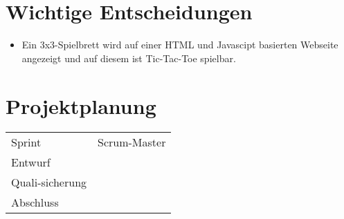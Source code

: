 \documentclass[titlepage]{scrartcl}
\begin{document}
\section{Wichtige Entscheidungen}
\begin{itemize}
\item Ein 3x3-Spielbrett wird auf einer HTML und Javascipt basierten Webseite angezeigt und auf diesem ist Tic-Tac-Toe spielbar.
\end{itemize}
\section{Projektplanung}%
\begin{tabular}{lc}
	Sprint & Scrum-Master\\
	Entwurf & \\
	Quali-sicherung & \\
	Abschluss & \\
\end{tabular}
\end{document}
